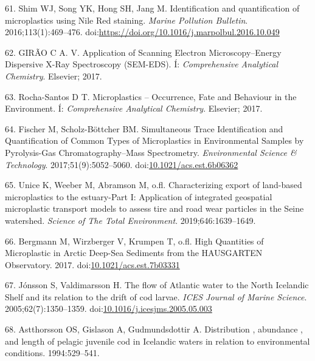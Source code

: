 \documentclass[icelandic,]{book}
\begin{document}
\leavevmode\hypertarget{ref-SHIM2016469}{}%
61. Shim WJ, Song YK, Hong SH, Jang M. Identification and quantification of microplastics using Nile Red staining. \emph{Marine Pollution Bulletin}. 2016;113(1):469--476. doi:\href{https://doi.org/https://doi.org/10.1016/j.marpolbul.2016.10.049}{https://doi.org/10.1016/j.marpolbul.2016.10.049}

\leavevmode\hypertarget{ref-bitam2014bio2}{}%
62. GIRÃO C A. V. Application of Scanning Electron Microscopy--Energy Dispersive X-Ray Spectroscopy (SEM-EDS). Í: \emph{Comprehensive Analytical Chemistry}. Elsevier; 2017.

\leavevmode\hypertarget{ref-k22014bio2}{}%
63. Rocha-Santos D T. Microplastics -- Occurrence, Fate and Behaviour in the Environment. Í: \emph{Comprehensive Analytical Chemistry}. Elsevier; 2017.

\leavevmode\hypertarget{ref-Fischer2017}{}%
64. Fischer M, Scholz-Böttcher BM. Simultaneous Trace Identification and Quantification of Common Types of Microplastics in Environmental Samples by Pyrolysis-Gas Chromatography--Mass Spectrometry. \emph{Environmental Science \& Technology}. 2017;51(9):5052--5060. doi:\href{https://doi.org/10.1021/acs.est.6b06362}{10.1021/acs.est.6b06362}

\leavevmode\hypertarget{ref-unice2019characterizing1}{}%
65. Unice K, Weeber M, Abramson M, o.fl. Characterizing export of land-based microplastics to the estuary-Part I: Application of integrated geospatial microplastic transport models to assess tire and road wear particles in the Seine watershed. \emph{Science of The Total Environment}. 2019;646:1639--1649.

\leavevmode\hypertarget{ref-Bergmann2017}{}%
66. Bergmann M, Wirzberger V, Krumpen T, o.fl. High Quantities of Microplastic in Arctic Deep-Sea Sediments from the HAUSGARTEN Observatory. 2017. doi:\href{https://doi.org/10.1021/acs.est.7b03331}{10.1021/acs.est.7b03331}

\leavevmode\hypertarget{ref-Strait2005a}{}%
67. Jónsson S, Valdimarsson H. The flow of Atlantic water to the North Icelandic Shelf and its relation to the drift of cod larvae. \emph{ICES Journal of Marine Science}. 2005;62(7):1350--1359. doi:\href{https://doi.org/10.1016/j.icesjms.2005.05.003}{10.1016/j.icesjms.2005.05.003}

\leavevmode\hypertarget{ref-Astthorsson1994}{}%
68. Astthorsson OS, Gislason A, Gudmundsdottir A. Distribution , abundance , and length of pelagic juvenile cod in Icelandic waters in relation to environmental conditions. 1994:529--541.
\end{document}
